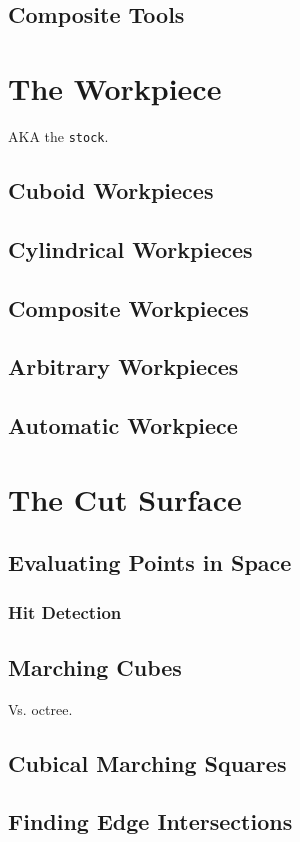 \documentclass{report}
\begin{document}
\section{Composite Tools}

\chapter{The Workpiece}
AKA the {\tt stock}.
\section{Cuboid Workpieces}
\section{Cylindrical Workpieces}
\section{Composite Workpieces}
\section{Arbitrary Workpieces}
\section{Automatic Workpiece}

\chapter{The Cut Surface}
\section{Evaluating Points in Space}
\subsection{Hit Detection}

\section{Marching Cubes}
Vs. octree.
\section{Cubical Marching Squares}
\section{Finding Edge Intersections}
\end{document}
